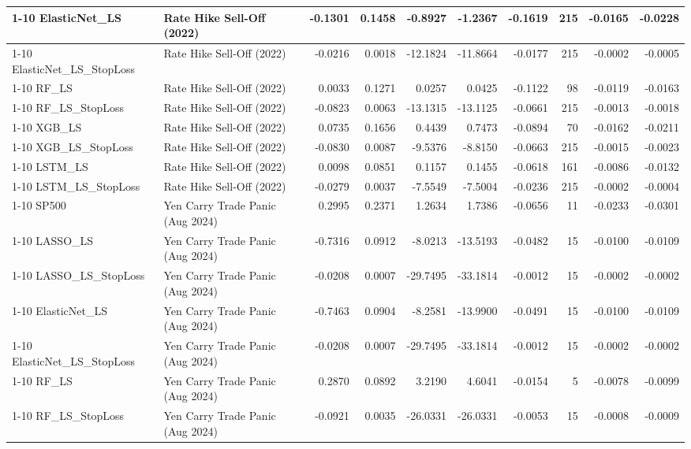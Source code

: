 \begin{tabular}{llrrrrrrrr}
\cline{1-10}
ElasticNet\_LS & Rate Hike Sell-Off (2022) & -0.1301 & 0.1458 & -0.8927 & -1.2367 & -0.1619 & 215 & -0.0165 & -0.0228 \\
\cline{1-10}
ElasticNet\_LS\_StopLoss & Rate Hike Sell-Off (2022) & -0.0216 & 0.0018 & -12.1824 & -11.8664 & -0.0177 & 215 & -0.0002 & -0.0005 \\
\cline{1-10}
RF\_LS & Rate Hike Sell-Off (2022) & 0.0033 & 0.1271 & 0.0257 & 0.0425 & -0.1122 & 98 & -0.0119 & -0.0163 \\
\cline{1-10}
RF\_LS\_StopLoss & Rate Hike Sell-Off (2022) & -0.0823 & 0.0063 & -13.1315 & -13.1125 & -0.0661 & 215 & -0.0013 & -0.0018 \\
\cline{1-10}
XGB\_LS & Rate Hike Sell-Off (2022) & 0.0735 & 0.1656 & 0.4439 & 0.7473 & -0.0894 & 70 & -0.0162 & -0.0211 \\
\cline{1-10}
XGB\_LS\_StopLoss & Rate Hike Sell-Off (2022) & -0.0830 & 0.0087 & -9.5376 & -8.8150 & -0.0663 & 215 & -0.0015 & -0.0023 \\
\cline{1-10}
LSTM\_LS & Rate Hike Sell-Off (2022) & 0.0098 & 0.0851 & 0.1157 & 0.1455 & -0.0618 & 161 & -0.0086 & -0.0132 \\
\cline{1-10}
LSTM\_LS\_StopLoss & Rate Hike Sell-Off (2022) & -0.0279 & 0.0037 & -7.5549 & -7.5004 & -0.0236 & 215 & -0.0002 & -0.0004 \\
\cline{1-10}
SP500 & Yen Carry Trade Panic (Aug 2024) & 0.2995 & 0.2371 & 1.2634 & 1.7386 & -0.0656 & 11 & -0.0233 & -0.0301 \\
\cline{1-10}
LASSO\_LS & Yen Carry Trade Panic (Aug 2024) & -0.7316 & 0.0912 & -8.0213 & -13.5193 & -0.0482 & 15 & -0.0100 & -0.0109 \\
\cline{1-10}
LASSO\_LS\_StopLoss & Yen Carry Trade Panic (Aug 2024) & -0.0208 & 0.0007 & -29.7495 & -33.1814 & -0.0012 & 15 & -0.0002 & -0.0002 \\
\cline{1-10}
ElasticNet\_LS & Yen Carry Trade Panic (Aug 2024) & -0.7463 & 0.0904 & -8.2581 & -13.9900 & -0.0491 & 15 & -0.0100 & -0.0109 \\
\cline{1-10}
ElasticNet\_LS\_StopLoss & Yen Carry Trade Panic (Aug 2024) & -0.0208 & 0.0007 & -29.7495 & -33.1814 & -0.0012 & 15 & -0.0002 & -0.0002 \\
\cline{1-10}
RF\_LS & Yen Carry Trade Panic (Aug 2024) & 0.2870 & 0.0892 & 3.2190 & 4.6041 & -0.0154 & 5 & -0.0078 & -0.0099 \\
\cline{1-10}
RF\_LS\_StopLoss & Yen Carry Trade Panic (Aug 2024) & -0.0921 & 0.0035 & -26.0331 & -26.0331 & -0.0053 & 15 & -0.0008 & -0.0009 \\

\end{tabular}
